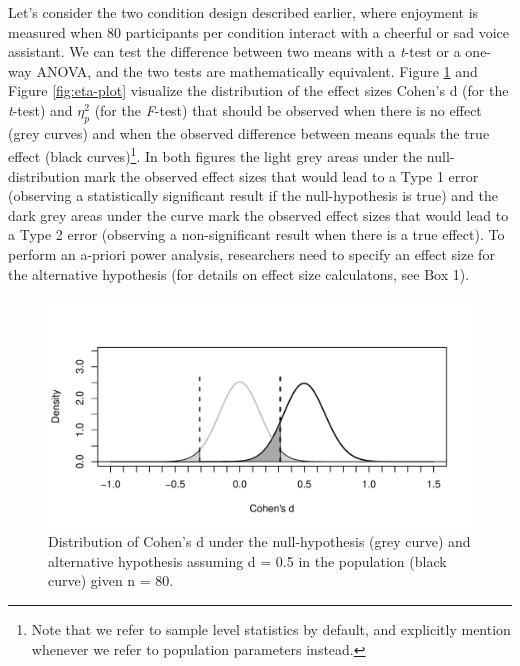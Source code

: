 \documentclass[
  english,
  ,jou,floatsintext]{apa6}
\begin{document}
Let's consider the two condition design described earlier, where enjoyment is measured when 80 participants per condition interact with a cheerful or sad voice assistant.
We can test the difference between two means with a \emph{t}-test or a one-way ANOVA, and the two tests are mathematically equivalent.
Figure \ref{fig:d-plot} and Figure \ref{fig:eta-plot} visualize the distribution of the effect sizes Cohen's d (for the \emph{t}-test) and \(\eta_p^2\) (for the \emph{F}-test) that should be observed when there is no effect (grey curves) and when the observed difference between means equals the true effect (black curves)\footnote{Note that we refer to sample level statistics by default, and explicitly mention whenever we refer to population parameters instead.}.
In both figures the light grey areas under the null-distribution mark the observed effect sizes that would lead to a Type 1 error (observing a statistically significant result if the null-hypothesis is true) and the dark grey areas under the curve mark the observed effect sizes that would lead to a Type 2 error (observing a non-significant result when there is a true effect).
To perform an a-priori power analysis, researchers need to specify an effect size for the alternative hypothesis (for details on effect size calculatons, see Box 1).

\begin{figure}
\centering
\includegraphics{0.1_Simulation_Based_Power_Analysis_For_Factorial_ANOVA_Designs_files/figure-latex/d-plot-1.pdf}
\caption{\label{fig:d-plot}Distribution of Cohen's d under the null-hypothesis (grey curve) and alternative hypothesis assuming d = 0.5 in the population (black curve) given n = 80.}
\end{figure}
\end{document}

